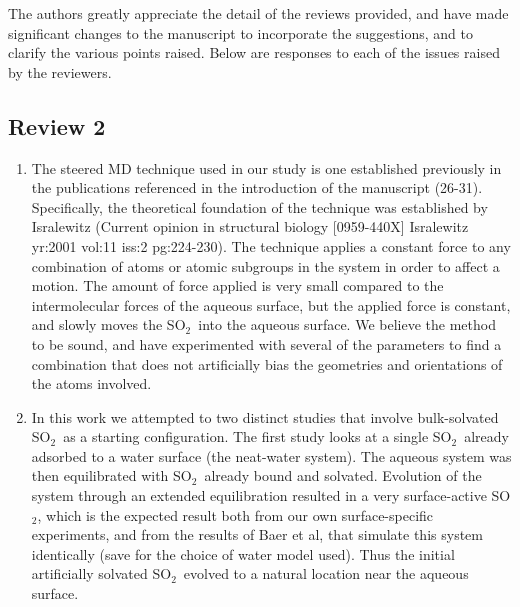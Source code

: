 \documentclass{article}
\begin{document}
\newcommand{\suldiox}{SO$_2$}
\newcommand{\ang}{\,$\textrm{\AA}$}
\newcommand{\angs}{\ang}
\newcommand{\wat}{H$_2$O}


The authors greatly appreciate the detail of the reviews provided, and have made significant changes to the manuscript to incorporate the suggestions, and to clarify the various points raised. Below are responses to each of the issues raised by the reviewers.

\subsection*{Review 2}

\begin{enumerate}

\item The steered MD technique used in our study is one established previously in the publications referenced in the introduction of the manuscript (26-31). Specifically, the theoretical foundation of the technique was established by Isralewitz (Current opinion in structural biology [0959-440X] Isralewitz yr:2001 vol:11 iss:2 pg:224-230). The technique applies a constant force to any combination of atoms or atomic subgroups in the system in order to affect a motion. The amount of force applied is very small compared to the intermolecular forces of the aqueous surface, but the applied force is constant, and slowly moves the \suldiox~into the aqueous surface. We believe the method to be sound, and have experimented with several of the parameters to find a combination that does not artificially bias the geometries and orientations of the atoms involved.

\item In this work we attempted to two distinct studies that involve bulk-solvated \suldiox~as a starting configuration. The first study looks at a single \suldiox~already adsorbed to a water surface (the neat-water system). The aqueous system was then equilibrated with \suldiox~already bound and solvated. Evolution of the system through an extended equilibration resulted in a very surface-active \suldiox, which is the expected result both from our own surface-specific experiments, and from the results of Baer et al, that simulate this system identically (save for the choice of water model used). Thus the initial artificially solvated \suldiox~evolved to a natural location near the aqueous surface.


\end{enumerate}
\end{document}
